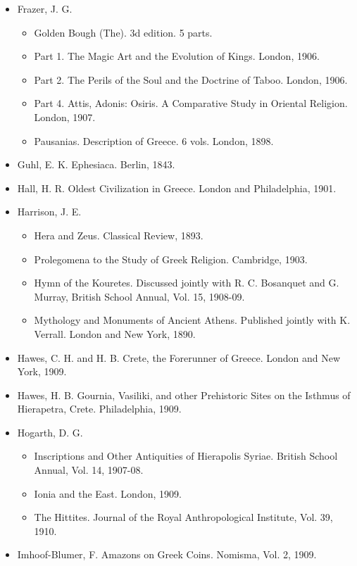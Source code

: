 \documentclass[a4paper, 12pt, oneside]{article}
\begin{document}
\begin{itemize}
    \item Frazer, J. G.
    \begin{itemize}
        \item Golden Bough (The). 3d edition. 5 parts.
        \item Part 1. The Magic Art and the Evolution of Kings. London, 1906.  
        \item Part 2. The Perils of the Soul and the Doctrine of Taboo. London, 1906.  
        \item Part 4. Attis, Adonis: Osiris. A Comparative Study in Oriental Religion. London, 1907.  
        \item Pausanias. Description of Greece. 6 vols. London, 1898.
    \end{itemize}
    \item Guhl, E. K. Ephesiaca. Berlin, 1843.
    \item Hall, H. R. Oldest Civilization in Greece. London and Philadelphia, 1901.
    \item Harrison, J. E.
    \begin{itemize}
        \item Hera and Zeus. Classical Review, 1893.
        \item Prolegomena to the Study of Greek Religion. Cambridge, 1903.  
        \item Hymn of the Kouretes. Discussed jointly with R. C. Bosanquet and G. Murray, British School Annual, Vol. 15, 1908-09.
        \item Mythology and Monuments of Ancient Athens. Published jointly with K. Verrall. London and New York, 1890.
    \end{itemize}
    \item Hawes, C. H. and H. B. Crete, the Forerunner of Greece. London and New York, 1909.
    \item Hawes, H. B. Gournia, Vasiliki, and other Prehistoric Sites on the Isthmus of Hierapetra, Crete. Philadelphia, 1909.
    \item Hogarth, D. G.
    \begin{itemize}
        \item Inscriptions and Other Antiquities of Hierapolis Syriae. British School Annual, Vol. 14, 1907-08.
        \item Ionia and the East. London, 1909.
        \item The Hittites. Journal of the Royal Anthropological Institute, Vol. 39, 1910.
    \end{itemize}
    \item Imhoof-Blumer, F. Amazons on Greek Coins. Nomisma, Vol. 2, 1909.

\end{itemize}
\end{document}
